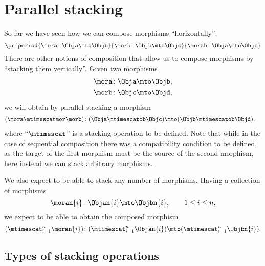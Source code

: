 
\section{Parallel stacking}
\label{sec:parallel-stacking}

So far we have seen how we can compose morphisms ``horizontally'':
%
\begin{equation}
    \prfperiod{
        \mora \colon \Obja \mto \Objb
    }{
        \morb\colon \Objb \mto \Objc
    }{
        \morab \colon \Obja \mto \Objc
    }
\end{equation}
%
There are other notions of composition that allow us to compose morphisms by ``stacking them vertically''.
Given two morphisms
%
\begin{align}
    \mora & \colon \Obja \mto \Objb, \\
    \morb & \colon \Objc \mto \Objd,
\end{align}
%
we will obtain by parallel stacking a morphism
%
\begin{align}
    (\mora\mtimescatmor \morb)
     & \colon (\Obja \mtimescatob \Objc) \mto (\Objb \mtimescatob \Objd),
\end{align}
%
where ``$\mtimescat$'' is a stacking operation to be defined.
Note that while in the case of sequential composition there was a compatibility condition to be defined, as the target of the first morphism must be the source of the second morphism, here instead we can stack arbitrary morphisms.

We also expect to be able to stack any number of morphisms.
Having a collection of morphisms
%
\begin{equation}
    \moran{i} \colon \Objan{i} \mto \Objbn{i}, \qquad 1 \leq i \leq n,
\end{equation}
%
we expect to be able to obtain the composed morphism
%
\begin{equation}
    (\mtimescat_{i=1}^n \moran{i} )
    \colon( \mtimescat_{i=1}^n \Objan{i} )\mto (\mtimescat_{i=1}^n \Objbn{i}).
\end{equation}

\subsection{Types of stacking operations}

